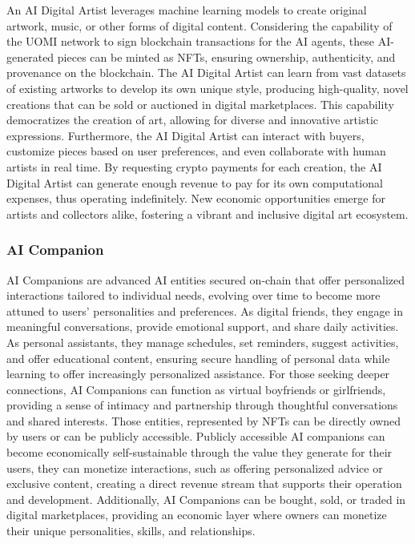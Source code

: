 \documentclass{article}
\begin{document}
An AI Digital Artist leverages machine learning models to create original artwork, music, or other forms of digital content. Considering the capability of the UOMI network to sign blockchain transactions for the AI agents, these AI-generated pieces can be minted as NFTs, ensuring ownership, authenticity, and provenance on the blockchain. The AI Digital Artist can learn from vast datasets of existing artworks to develop its own unique style, producing high-quality, novel creations that can be sold or auctioned in digital marketplaces. This capability democratizes the creation of art, allowing for diverse and innovative artistic expressions. Furthermore, the AI Digital Artist can interact with buyers, customize pieces based on user preferences, and even collaborate with human artists in real time. By requesting crypto payments for each creation, the AI Digital Artist can generate enough revenue to pay for its own computational expenses, thus operating indefinitely. New economic opportunities emerge for artists and collectors alike, fostering a vibrant and inclusive digital art ecosystem. 

\subsubsection{AI Companion}

AI Companions are advanced AI entities secured on-chain that offer personalized interactions tailored to individual needs, evolving over time to become more attuned to users’ personalities and preferences. As digital friends, they engage in meaningful conversations, provide emotional support, and share daily activities. As personal assistants, they manage schedules, set reminders, suggest activities, and offer educational content, ensuring secure handling of personal data while learning to offer increasingly personalized assistance. For those seeking deeper connections, AI Companions can function as virtual boyfriends or girlfriends, providing a sense of intimacy and partnership through thoughtful conversations and shared interests. Those entities, represented by NFTs can be directly owned by users or can be publicly accessible. Publicly accessible AI companions can become economically self-sustainable through the value they generate for their users,  they can monetize interactions, such as offering personalized advice or exclusive content, creating a direct revenue stream that supports their operation and development. Additionally, AI Companions can be bought, sold, or traded in digital marketplaces, providing an economic layer where owners can monetize their unique personalities, skills, and relationships.
\end{document}
